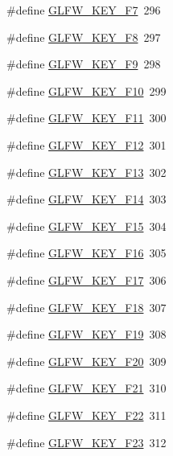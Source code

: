 \begin{DoxyCompactItemize}
\item 
\#define \hyperlink{group__keys_gacca6ef8a2162c52a0ac1d881e8d9c38a}{G\+L\+F\+W\+\_\+\+K\+E\+Y\+\_\+\+F7}~296
\item 
\#define \hyperlink{group__keys_gac9d39390336ae14e4a93e295de43c7e8}{G\+L\+F\+W\+\_\+\+K\+E\+Y\+\_\+\+F8}~297
\item 
\#define \hyperlink{group__keys_gae40de0de1c9f21cd26c9afa3d7050851}{G\+L\+F\+W\+\_\+\+K\+E\+Y\+\_\+\+F9}~298
\item 
\#define \hyperlink{group__keys_ga718d11d2f7d57471a2f6a894235995b1}{G\+L\+F\+W\+\_\+\+K\+E\+Y\+\_\+\+F10}~299
\item 
\#define \hyperlink{group__keys_ga0bc04b11627e7d69339151e7306b2832}{G\+L\+F\+W\+\_\+\+K\+E\+Y\+\_\+\+F11}~300
\item 
\#define \hyperlink{group__keys_gaf5908fa9b0a906ae03fc2c61ac7aa3e2}{G\+L\+F\+W\+\_\+\+K\+E\+Y\+\_\+\+F12}~301
\item 
\#define \hyperlink{group__keys_gad637f4308655e1001bd6ad942bc0fd4b}{G\+L\+F\+W\+\_\+\+K\+E\+Y\+\_\+\+F13}~302
\item 
\#define \hyperlink{group__keys_gaf14c66cff3396e5bd46e803c035e6c1f}{G\+L\+F\+W\+\_\+\+K\+E\+Y\+\_\+\+F14}~303
\item 
\#define \hyperlink{group__keys_ga7f70970db6e8be1794da8516a6d14058}{G\+L\+F\+W\+\_\+\+K\+E\+Y\+\_\+\+F15}~304
\item 
\#define \hyperlink{group__keys_gaa582dbb1d2ba2050aa1dca0838095b27}{G\+L\+F\+W\+\_\+\+K\+E\+Y\+\_\+\+F16}~305
\item 
\#define \hyperlink{group__keys_ga972ce5c365e2394b36104b0e3125c748}{G\+L\+F\+W\+\_\+\+K\+E\+Y\+\_\+\+F17}~306
\item 
\#define \hyperlink{group__keys_gaebf6391058d5566601e357edc5ea737c}{G\+L\+F\+W\+\_\+\+K\+E\+Y\+\_\+\+F18}~307
\item 
\#define \hyperlink{group__keys_gaec011d9ba044058cb54529da710e9791}{G\+L\+F\+W\+\_\+\+K\+E\+Y\+\_\+\+F19}~308
\item 
\#define \hyperlink{group__keys_ga82b9c721ada04cd5ca8de767da38022f}{G\+L\+F\+W\+\_\+\+K\+E\+Y\+\_\+\+F20}~309
\item 
\#define \hyperlink{group__keys_ga356afb14d3440ff2bb378f74f7ebc60f}{G\+L\+F\+W\+\_\+\+K\+E\+Y\+\_\+\+F21}~310
\item 
\#define \hyperlink{group__keys_ga90960bd2a155f2b09675324d3dff1565}{G\+L\+F\+W\+\_\+\+K\+E\+Y\+\_\+\+F22}~311
\item 
\#define \hyperlink{group__keys_ga43c21099aac10952d1be909a8ddee4d5}{G\+L\+F\+W\+\_\+\+K\+E\+Y\+\_\+\+F23}~312

\end{DoxyCompactItemize}
